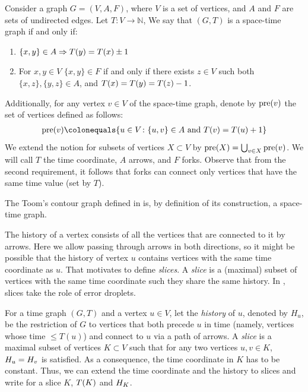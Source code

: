   \begin{definition}
    Consider a graph $G = (V, A, F)$, where $V$ is a set of vertices, and $A$ and $F$ are sets of undirected edges. 
    Let $ T \colon V \rightarrow \mathbb{N}$, We say that $(G,T)$ is a space-time graph if and only if:
\begin{enumerate}
  \item $\{x,y\} \in A \Rightarrow T(y) = T(x) \pm 1$  
  \item For $x,y \in V $  $\{x,y\} \in F $ if and only if there exists $z \in V $ such both $\{x,z\},\{y,z\} \in A$, and $T(x) = T(y) = T(z)-1$. 
\end{enumerate} 
Additionally, for any vertex $v \in V$ of the space-time graph, denote by $\text{pre}(v)$ the set of vertices defined as follows: 
    \begin{equation*}
      \begin{split}
\pre{v} \colonequals \{ u \in V \colon \{u,v\} \in A \text{ and } \Time{v} = \Time{u} + 1 \}
      \end{split}
    \end{equation*}
We extend the notion for subsets of vertices $X \subset V$ by $\text{pre}(X) = \bigcup_{v \in X} \text{pre}(v)$. We will call $T$ the time coordinate, $A$ arrows, and $F$ forks. Observe that from the second requirement, it follows that forks can connect only vertices that have the same time value (set by $T$).
  \end{definition}
  \begin{remark}
    The Toom's contour graph defined in  is, by definition of its construction, a space-time graph.
\end{remark}
The history of a vertex consists of all the vertices that are connected to it by arrows. Here we allow passing through arrows in both directions, so it might be possible that the history of vertex $u$ contains vertices with the same time coordinate as $u$. That motivates to define \textit{slices}. A \textit{slice} is a (maximal) subset of vertices with the same time coordinate such they share the same history. In \cite{Berman}, slices take the role of error droplets.
  \begin{definition}
    \label{def:slice}
For a time graph $(G,T)$ and a vertex $u \in V$, let the \textit{history} of $u$, denoted by $H_{u}$, be the restriction of $G$ to vertices that both precede $u$ in time (namely, vertices whose time $\le T(u)$) and connect to $u$ via a path of arrows. A \textit{slice} is a maximal subset of vertices $K \subset V$ such that for any two vertices $u,v \in K$, $H_{u} = H_{v}$ is satisfied. As a consequence, the time coordinate in $K$ has to be constant. Thus, we can extend the time coordinate and the history to slices and write for a slice $K$, $T(K)$ and $H_{K}$.
  \end{definition}
